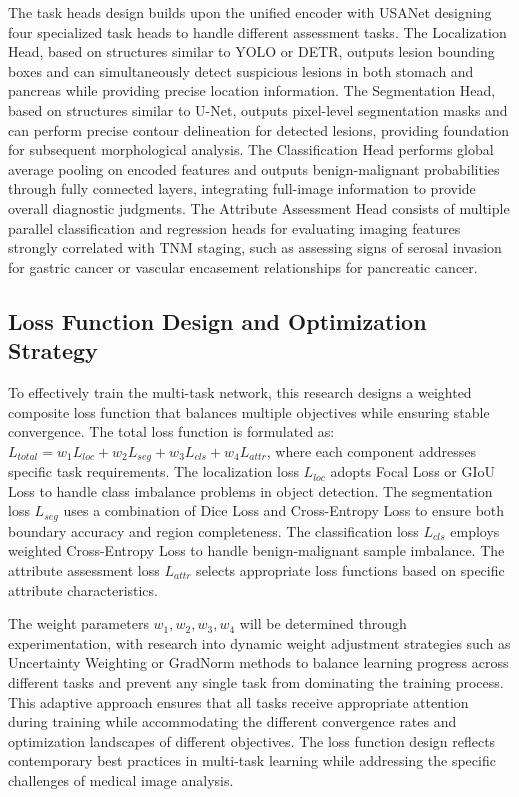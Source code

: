 The task heads design builds upon the unified encoder with USANet designing four specialized task heads to handle different assessment tasks. The Localization Head, based on structures similar to YOLO or DETR, outputs lesion bounding boxes and can simultaneously detect suspicious lesions in both stomach and pancreas while providing precise location information. The Segmentation Head, based on structures similar to U-Net, outputs pixel-level segmentation masks and can perform precise contour delineation for detected lesions, providing foundation for subsequent morphological analysis. The Classification Head performs global average pooling on encoded features and outputs benign-malignant probabilities through fully connected layers, integrating full-image information to provide overall diagnostic judgments. The Attribute Assessment Head consists of multiple parallel classification and regression heads for evaluating imaging features strongly correlated with TNM staging, such as assessing signs of serosal invasion for gastric cancer or vascular encasement relationships for pancreatic cancer.

\subsection{Loss Function Design and Optimization Strategy}

To effectively train the multi-task network, this research designs a weighted composite loss function that balances multiple objectives while ensuring stable convergence. The total loss function is formulated as: $L_{total} = w_1 L_{loc} + w_2 L_{seg} + w_3 L_{cls} + w_4 L_{attr}$, where each component addresses specific task requirements. The localization loss $L_{loc}$ adopts Focal Loss or GIoU Loss to handle class imbalance problems in object detection. The segmentation loss $L_{seg}$ uses a combination of Dice Loss and Cross-Entropy Loss to ensure both boundary accuracy and region completeness. The classification loss $L_{cls}$ employs weighted Cross-Entropy Loss to handle benign-malignant sample imbalance. The attribute assessment loss $L_{attr}$ selects appropriate loss functions based on specific attribute characteristics.

The weight parameters $w_1, w_2, w_3, w_4$ will be determined through experimentation, with research into dynamic weight adjustment strategies such as Uncertainty Weighting or GradNorm methods to balance learning progress across different tasks and prevent any single task from dominating the training process. This adaptive approach ensures that all tasks receive appropriate attention during training while accommodating the different convergence rates and optimization landscapes of different objectives. The loss function design reflects contemporary best practices in multi-task learning while addressing the specific challenges of medical image analysis.

